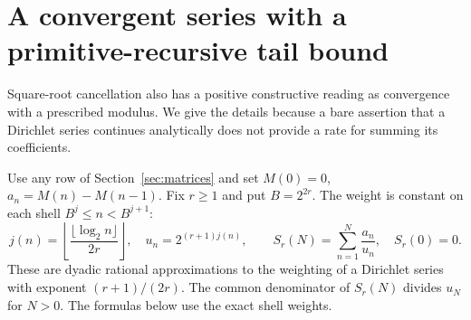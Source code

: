 \section{A convergent series with a primitive-recursive tail bound}\label{sec:series}
Square-root cancellation also has a positive constructive reading as convergence with a prescribed modulus. We give the details because a bare assertion that a Dirichlet series continues analytically does not provide a rate for summing its coefficients.

Use any row of Section~\ref{sec:matrices} and set $M(0)=0$, $a_n=M(n)-M(n-1)$. Fix $r\ge1$ and put $B=2^{2r}$. The weight is constant on each shell $B^j\le n<B^{j+1}$:
\[
 j(n)=\left\lfloor\frac{\lfloor\log_2 n\rfloor}{2r}\right\rfloor,\quad
 u_n=2^{(r+1)j(n)},\qquad S_r(N)=\sum_{n=1}^N\frac{a_n}{u_n},\quad S_r(0)=0 .
\]
These are dyadic rational approximations to the weighting of a Dirichlet series with exponent $(r+1)/(2r)$. The common denominator of $S_r(N)$ divides $u_N$ for $N>0$. The formulas below use the exact shell weights.

